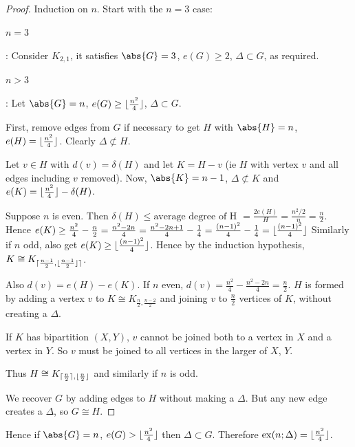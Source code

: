 \documentclass{article}
\DeclareMathOperator{\ext}{ex}
\DeclarePairedDelimiter\ceil{\lceil}{\rceil}
\DeclarePairedDelimiter\floor{\lfloor}{\rfloor}
\begin{document}
\begin{proof}
    Induction on $n$. Start with the $n=3$ case:
    \paragraph{$n=3$}: Consider $K_{2, 1}$, it satisfies $\abs{G} = 3$, $e(G) \geq 2$, $\Delta \subset G$, as required.
    \paragraph{$n>3$}: Let $\abs{G} = n$, $e(G) \geq \floor{\frac{n^2}{4}}$, $\Delta \subset G$.

    First, remove edges from $G$ if necessary to get $H$ with $\abs{H} = n$, $e(H) = \floor{\frac{n^2}{4}}$. Clearly $\Delta \not\subset H$.

    Let $v \in H$ with $d(v) = \delta(H)$ and let $K = H - v$ (ie $H$ with vertex $v$ and all edges including $v$ removed). Now, $\abs{K} = n-1$, $\Delta \not\subset K$ and $e(K) = \floor{\frac{n^2}{4}} - \delta(H)$.

    Suppose $n$ is even. Then $\delta(H) \leq \text{average degree of H } = \frac{2 e(H)}{H} = \frac{n^2/2}{n} = \frac{n}{2}$.
    Hence $e(K) \geq \frac{n^2}{4} - \frac{n}{2} = \frac{n^2 - 2n}{4} = \frac{n^2 - 2n + 1}{4} - \frac{1}{4} = \frac{(n-1)^2}{4} - \frac{1}{4} = \floor{\frac{(n-1)^2}{4}}$
    Similarly if $n$ odd, also get $e(K) \geq \floor{\frac{(n-1)^2}{4}}$. Hence by the induction hypothesis, $K \cong K_{\ceil{\frac{n-1}{2}, \floor{\frac{n-1}{2}}}}$.

    Also $d(v) = e(H) - e(K)$.
    If $n$ even, $d(v) = \frac{n^2}{4} - \frac{n^2 - 2n}{4} = \frac{n}{2}$.
    $H$ is formed by adding a vertex $v$ to $K \cong K_{\frac{n}{2}, \frac{n-2}{2}}$ and joining $v$ to $\frac{n}{2}$ vertices of $K$, without creating a $\Delta$.

    If $K$ has bipartition $(X, Y)$, $v$ cannot be joined both to a vertex in $X$ and a vertex in $Y$. So $v$ must be joined to all vertices in the larger of $X$, $Y$.

    Thus $H \cong K_{\ceil{\frac{n}{2}}, \floor{\frac{n}{2}}}$ and similarly if $n$ is odd.

    We recover $G$ by adding edges to $H$ without making a $\Delta$. But any new edge creates a $\Delta$, so $G \cong H$.
\end{proof}

Hence if $\abs{G} = n$, $e(G) > \floor{\frac{n^2}{4}}$ then $\Delta \subset G$. Therefore $\ext(n; \Delta) = \floor{\frac{n^2}{4}}$.
\end{document}
